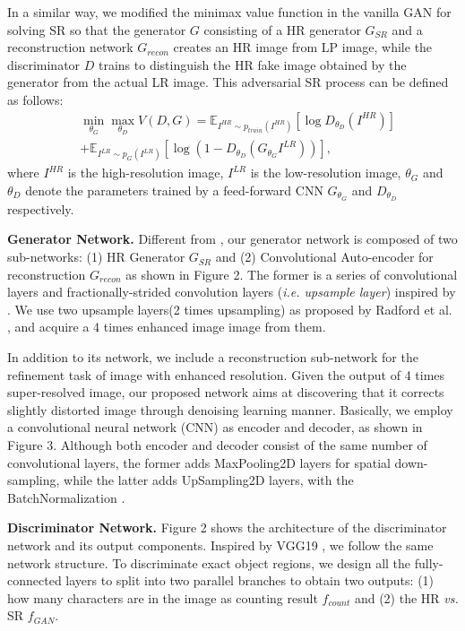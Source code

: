 \documentclass[a4paper,twoside]{article}
\begin{document}
    In a similar way, we modified the minimax value function in the vanilla GAN for solving SR so that the generator $G$ consisting of a HR generator $G_{SR}$ and a reconstruction network $G_{recon}$ creates an HR image from LP image, while the discriminator $D$ trains to distinguish the HR fake image obtained by the generator from the actual LR image. This adversarial SR process can be defined as follows:
\begin{equation}
    	\begin{split}
        	&\min_{\theta _G} \max_{\theta _D} V(D,G) = \mathbb{E}_{I^{HR} \sim p_{train}(I^{HR})}[\log D_{\theta _D}(I^{HR})] \\
        	& + \mathbb{E}_{I^{LR} \sim p_{G}(I^{LR})}[\log (1 - D_{\theta _D}(G_{\theta _G}I^{LR}))],
        \end{split}
    	\end{equation}
     where $I^{HR}$ is the high-resolution image, $I^{LR}$ is the low-resolution image, $\theta _G$ and $\theta _D$ denote the parameters trained by a feed-forward CNN $G_{\theta _G}$ and $D_{\theta _D}$ respectively. 
     
     \textbf{Generator Network.} Different from \cite{goodfellow2014generative}, our generator network is composed of two sub-networks: (1) HR Generator $G_{SR}$ and (2) Convolutional Auto-encoder for reconstruction $G_{recon}$ as shown in Figure 2. The former is a series of convolutional layers and fractionally-strided convolution layers (\textit{i.e. upsample layer}) inspired by \cite{ledig2017photo}. We use two upsample layers(2 times upsampling) as proposed by Radford et al. \cite{radford2015unsupervised}, and acquire a 4 times enhanced image image from them. 
     
     In addition to its network, we include a reconstruction sub-network for the refinement task of image with enhanced resolution. Given the output of 4 times super-resolved image, our proposed network aims at discovering that it corrects slightly distorted image through denoising learning manner. Basically, we employ a convolutional neural network (CNN) as encoder and decoder, as shown in Figure 3. Although both encoder and decoder consist of the same number of convolutional layers, the former adds MaxPooling2D layers for spatial down-sampling, while the latter adds UpSampling2D layers, with the BatchNormalization \cite{ioffe2015batch}. 
     
     \textbf{Discriminator Network.} Figure 2 shows the architecture of the discriminator network and its output components. Inspired by VGG19 \cite{simonyan2014very}, we follow the same network structure. To discriminate exact object regions, we design all the fully-connected layers to split into two parallel branches to obtain two outputs: (1) how many characters are in the image as counting result $f_{count}$ and (2) the HR \textit{vs.} SR $f_{GAN}$. 
     
\end{document}
